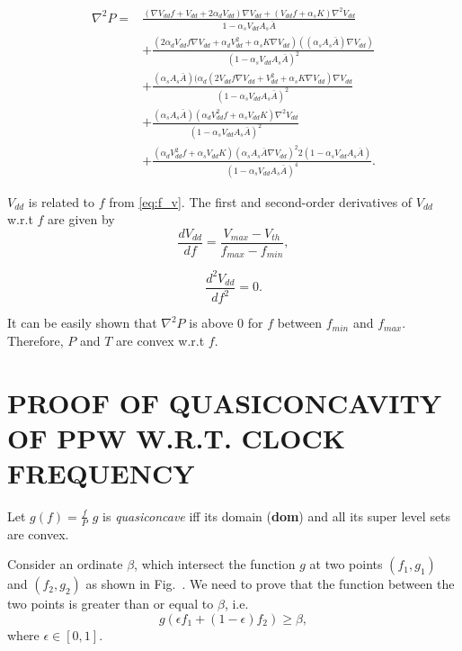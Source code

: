 \begin{appendices}
\begin{equation}\label{eq:p_transient_d2}
\begin{split}
\nabla^{2} P =&\frac{(\nabla V_{dd}f+V_{dd}+2\alpha_{d}V_{dd})\nabla V_{dd}+(V_{dd}f+\alpha_{s}K)\nabla^{2}V_{dd}}{1-\alpha_{s}V_{dd}A_{s}\bar{A}}\\
&+\frac{(2\alpha_{d}V_{dd}f\nabla V_{dd}+\alpha_{d}V_{dd}^{2}+\alpha_{s}K\nabla V_{dd})((\alpha_{s}A_{s}\bar{A})\nabla V_{dd} )}{(1-\alpha_{s}V_{dd}A_{s}\bar{A})^{2}}\\
&+\frac{(\alpha_{s}A_{s}\bar{A})(\alpha_{d}(2V_{dd}f\nabla V_{dd}+V_{dd}^{2}+\alpha_{s}K\nabla V_{dd})\nabla V_{dd}}{(1-\alpha_{s}V_{dd}A_{s}\bar{A})^{2}}\\
&+\frac{(\alpha_{s}A_{s}\bar{A})(\alpha_{d}V_{dd}^{2}f+\alpha_{s}V_{dd}K)\nabla^{2} V_{dd} }{(1-\alpha_{s}V_{dd}A_{s}\bar{A})^{2}}\\
&+\frac{(\alpha_{d}V_{dd}^{2}f+\alpha_{s}V_{dd}K)(\alpha_{s}A_{s}\bar{A}\nabla V_{dd})^{2} 2(1-\alpha_{s}V_{dd}A_{s}\bar{A})}{(1-\alpha_{s}V_{dd}A_{s}\bar{A})^{4}}.
\end{split}
\end{equation}


$V_{dd}$ is related to $f$ from \eqref{eq:f_v}. The first and second-order derivatives of $V_{dd}$ w.r.t $f$ are given by
\begin{equation}\label{eq:v_transient_d1}
\frac {dV_{dd}}{df} =\frac{V_{max}-V_{th}}{f_{max}-f_{min}},
\end{equation}

\begin{equation}\label{eq:v_transient_d1}
\frac {d^{2}V_{dd}}{df^{2}} =0.
\end{equation}

It can be easily shown that $\nabla^{2} P$ is above $0$ for $f$ between $f_{min}$ and $f_{max}$.
Therefore, $P$ and $T$ are convex w.r.t $f$.

\section{PROOF OF QUASICONCAVITY OF PPW W.R.T. CLOCK FREQUENCY}
Let $g(f) = \frac{f}{P}$
$g$ is \emph{quasiconcave} iff its domain (\textbf{dom}) and all its super level sets are convex. 

Consider an ordinate $\beta$, which intersect the function $g$ at two points $(f_{1},g_{1})$ and $(f_{2},g_{2})$ as shown in Fig.~. We need to prove that the function between the two points is greater than or equal to $\beta$, i.e.
\begin{equation}\label{eq:v_transient_d1}
g(\epsilon f_{1}+(1-\epsilon)f_{2})\geq \beta,
\end{equation}
where $\epsilon \in [0,1]$. 



\end{appendices}